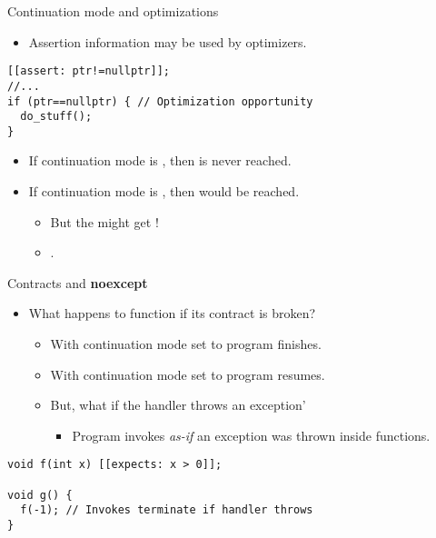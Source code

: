 \begin{frame}[t,fragile]{Continuation mode and optimizations}
\begin{itemize}
  \item Assertion information may be used by optimizers.
\end{itemize}
\begin{lstlisting}
[[assert: ptr!=nullptr]];
//...
if (ptr==nullptr) { // Optimization opportunity
  do_stuff();
}
\end{lstlisting}
\vfill\pause
\begin{itemize}[<+->]
  \item If continuation mode is , then  is never reached.
  \item If continuation mode is , then  would be
reached.
    \begin{itemize}[<+->]
      \item But the  might get !
      \item {}.
    \end{itemize}
\end{itemize}
\end{frame}

\begin{frame}[t,fragile]{Contracts and \textbf{noexcept}}
\begin{itemize}
  \item What happens to  function if its contract is broken?
    \begin{itemize}
      \item With continuation mode set to  program finishes.
      \item With continuation mode set to  program resumes.
      \item But, what if the handler throws an exception'
        \begin{itemize}
          \item Program invokes  \emph{as-if} an exception was thrown inside
functions.
        \end{itemize}
    \end{itemize}
\end{itemize}
\begin{lstlisting}
void f(int x) [[expects: x > 0]];

void g() {
  f(-1); // Invokes terminate if handler throws
}
\end{lstlisting}
\end{frame}
